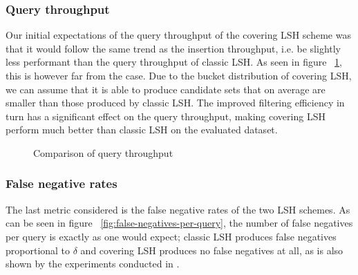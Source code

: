 \subsubsection{Query throughput}

Our initial expectations of the query throughput of the covering LSH scheme was that it would follow the same trend as the insertion throughput, i.e. be slightly less performant than the query throughput of classic LSH. As seen in figure ~\ref{fig:queries-per-second}, this is however far from the case. Due to the bucket distribution of covering LSH, we can assume that it is able to produce candidate sets that on average are smaller than those produced by classic LSH. The improved filtering efficiency in turn has a significant effect on the query throughput, making covering LSH perform much better than classic LSH on the evaluated dataset.

\begin{figure}[ht]
  \centering

  \caption{Comparison of query throughput}
  \label{fig:queries-per-second}
\end{figure}

\subsubsection{False negative rates}

The last metric considered is the false negative rates of the two LSH schemes. As can be seen in figure ~\ref{fig:false-negatives-per-query}, the number of false negatives per query is exactly as one would expect; classic LSH produces false negatives proportional to $\delta$ and covering LSH produces no false negatives at all, as is also shown by the experiments conducted in \cite{DBLP:journals/corr/PhamP16}.

